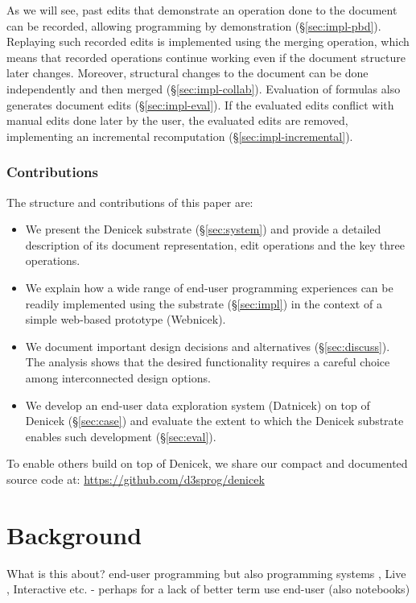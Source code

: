 \documentclass[sigconf,anonymous,screen]{acmart}
\begin{document}
As we will see, past edits that demonstrate an operation done to the
document can be recorded, allowing programming by demonstration (\S\ref{sec:impl-pbd}).  Replaying
such recorded edits is implemented using the merging operation, which means that recorded operations
continue working even if the document structure later changes. Moreover, structural changes to the
document can be done independently and then merged (\S\ref{sec:impl-collab}). Evaluation of formulas
also generates document edits (\S\ref{sec:impl-eval}). If the evaluated edits conflict with manual
edits done later by the user, the evaluated edits are removed, implementing an incremental
recomputation (\S\ref{sec:impl-incremental}).

\subsubsection*{Contributions}
The structure and contributions of this paper are:

\begin{itemize}
\item We present the Denicek substrate (\S\ref{sec:system}) and provide a detailed description of its
  document representation, edit operations and the key three operations.
\item We explain how a wide range of end-user programming experiences can be readily implemented using
  the substrate (\S\ref{sec:impl}) in the context of a simple web-based prototype (Webnicek).
\item We document important design decisions and alternatives (\S\ref{sec:discuss}). The analysis
  shows that the desired functionality requires a careful choice among interconnected design options.
\item We develop an end-user data exploration system (Datnicek) on top of Denicek (\S\ref{sec:case})
  and evaluate the extent to which the Denicek substrate enables such development (\S\ref{sec:eval}).
\end{itemize}

\noindent
To enable others build on top of Denicek, we share our compact and documented
source code at: \url{https://github.com/d3sprog/denicek}


\section{Background}
What is this about? end-user programming \cite{myers-2006-eup}
but also programming systems \cite{jakubovic-2023-techdims},
Live \cite{rein-2019-live}, Interactive etc. - perhaps for a lack of better term use end-user
(also notebooks)
\end{document}
